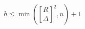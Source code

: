 \documentclass[preview]{standalone}
\begin{document}
\[
h\le\min\left(\left[\frac{R}{\Delta}\right]^2,n\right)+1
\]
\end{document}
